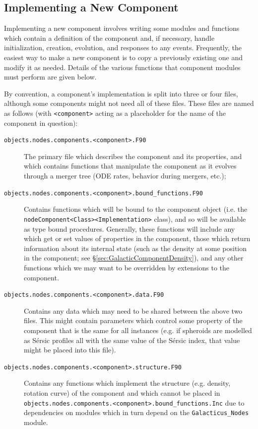 \subsection{Implementing a New Component}\label{sec:ComponentImplement}

Implementing a new component involves writing some modules and functions which contain a definition of the component and, if necessary, handle initialization, creation, evolution, and responses to any events. Frequently, the easiest way to make a new component is to copy a previously existing one and modify it as needed. Details of the various functions that component modules must perform are given below.

By convention, a component's implementation is split into three or four files, although some components might not need all of these files. These files are named as follows (with {\tt \textless component\textgreater} acting as a placeholder for the name of the component in question):
\begin{description}
 \item [{\tt objects.nodes.components.\textless component\textgreater.F90}] The primary file which describes the component and its properties, and which contains functions that manipulate the component as it evolves through a merger tree (ODE rates, behavior during mergers, etc.);
 \item [{\tt objects.nodes.components.\textless component\textgreater.bound\_functions.F90}] Contains functions which will be bound to the component object (i.e. the {\tt nodeComponent\textless Class\textgreater\textless Implementation\textgreater} class), and so will be available as type bound procedures. Generally, these functions will include any which get or set values of properties in the component, those which return information about its internal state (such as the density at some position in the component; see \S\ref{sec:GalacticComponentDensity}), and any other functions which we may want to be overridden by extensions to the component.
 \item [{\tt objects.nodes.components.\textless component\textgreater.data.F90}] Contains any data which may need to be shared between the above two files. This might contain parameters which control some property of the component that is the same for all instances (e.g. if spheroids are modelled as S\'ersic profiles all with the same value of the S\'ersic index, that value might be placed into this file).
 \item [{\tt objects.nodes.components.\textless component\textgreater.structure.F90}] Contains any functions which implement the structure (e.g. density, rotation curve) of the component and which cannot be placed in {\tt objects.nodes.components.\textless component\textgreater.bound\_functions.Inc} due to dependencies on modules which in turn depend on the {\tt Galacticus\_Nodes} module.
\end{description}
